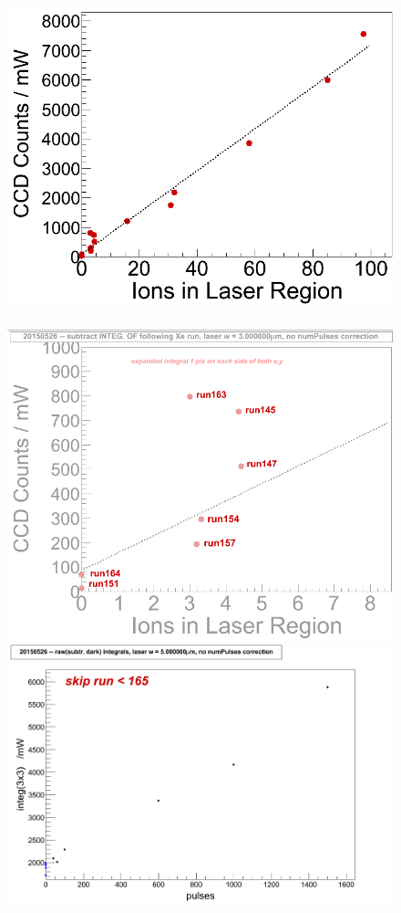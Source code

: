 

\begin{figure} %
        \centering
                \includegraphics[width=.5\textwidth]{figures/lin_20150526.png}
                ~
                \includegraphics[width=.5\textwidth]{figures/lin_pres_zoom_predictSingleAtom.png}
                \includegraphics[width=.5\textwidth]{figures/lin_vsPulses_all_3x3_pre-165.png}

\end{figure}
